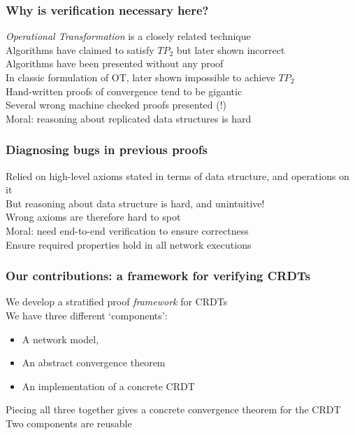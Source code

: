 \documentclass[professionalfonts,smallfonts]{beamer}
\begin{document}
\begin{frame}
\frametitle{Why is verification necessary here?}
\emph{Operational Transformation} is a closely related technique
\\[1.5ex]
Algorithms have claimed to satisfy $TP_2$ but later shown incorrect
\\[1.5ex]
Algorithms have been presented without any proof
\\[1.5ex]
In classic formulation of OT, later shown impossible to achieve $TP_2$
\\[1.5ex]
Hand-written proofs of convergence tend to be gigantic
\\[1.5ex]
Several wrong machine checked proofs presented (!)
\\[1.5ex]
Moral: reasoning about replicated data structures is hard
\end{frame}

\begin{frame}
\frametitle{Diagnosing bugs in previous proofs}
Relied on high-level axioms stated in terms of data structure, and operations on it
\\[1.5ex]
But reasoning about data structure is hard, and unintuitive!
\\[1.5ex]
Wrong axioms are therefore hard to spot
\\[1.5ex]
Moral: need end-to-end verification to ensure correctness
\\[1.5ex]
Ensure required properties hold in all network executions
\end{frame}

\begin{frame}
\frametitle{Our contributions: a framework for verifying CRDTs}
We develop a stratified proof \emph{framework} for CRDTs
\\[1.5ex]
We have three different `components':
\begin{itemize}
\item
A network model,
\item
An abstract convergence theorem
\item
An implementation of a concrete CRDT
\end{itemize}
Piecing all three together gives a concrete convergence theorem for the CRDT
\\[1.5ex]
Two components are reusable
\end{frame}
\end{document}
